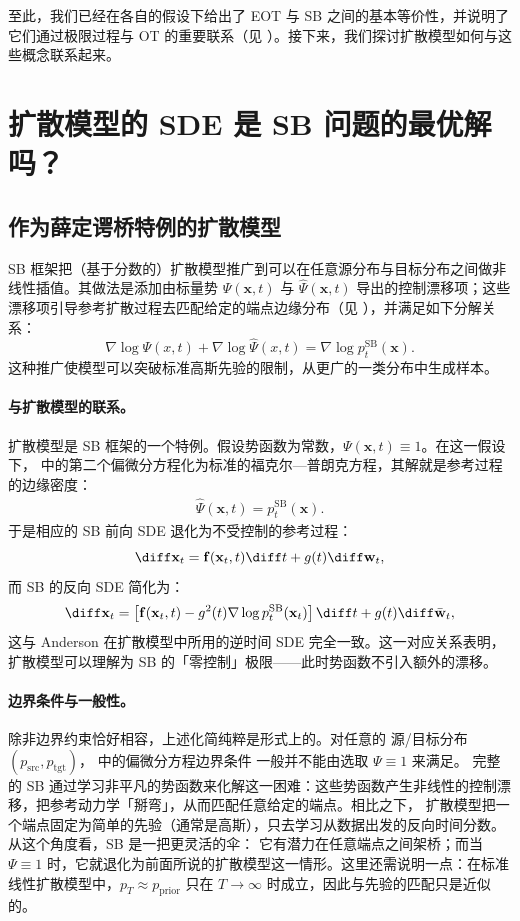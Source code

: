 至此，我们已经在各自的假设下给出了 EOT 与 SB 之间的基本等价性，并说明了它们通过极限过程与 OT 的重要联系（见 ）。接下来，我们探讨扩散模型如何与这些概念联系起来。


\section{扩散模型的 SDE 是 SB 问题的最优解吗？}\label{sec:dm-and-sb}


\subsection{作为薛定谔桥特例的扩散模型}

SB 框架把（基于分数的）扩散模型推广到可以在任意源分布与目标分布之间做非线性插值。其做法是添加由标量势 $\Psi(\mathbf{x}, t)$ 与 $\widehat{\Psi}(\mathbf{x}, t)$ 导出的控制漂移项；这些漂移项引导参考扩散过程去匹配给定的端点边缘分布（见 ），并满足如下分解关系：
\[
\nabla\log{\Psi(x,t)}+\nabla\log{\hat{\Psi}(x,t)}=\nabla \log p_t^{\mathrm{SB}}(\mathbf{x}).
\]
这种推广使模型可以突破标准高斯先验的限制，从更广的一类分布中生成样本。

\paragraph{与扩散模型的联系。}扩散模型是 SB 框架的一个特例。假设势函数为常数，$\Psi(\mathbf{x}, t) \equiv 1$。在这一假设下， 中的第二个偏微分方程化为标准的福克尔—普朗克方程，其解就是参考过程的边缘密度：
\begin{align}\label{eq:sb-backward-potential}
    \widehat{\Psi}(\mathbf{x}, t) = p_t^{\mathrm{SB}}(\mathbf{x}).
\end{align}
于是相应的 SB 前向 SDE 退化为不受控制的参考过程：
\[
    \diff\mathbf{x}_t = \mathbf{f}(\mathbf{x}_t, t)\diff t + g(t)\diff\mathbf{w}_t,
\]
而 SB 的反向 SDE 简化为：
\[
    \diff\mathbf{x}_t = \left[\mathbf{f}(\mathbf{x}_t, t) - g^2(t) \nabla \log p_t^{\mathrm{SB}}(\mathbf{x}_t) \right]\diff t + g(t)\diff\bar{\mathbf{w}}_t,
\]
这与 Anderson 在扩散模型中所用的逆时间 SDE 完全一致。这一对应关系表明，扩散模型可以理解为 SB 的「零控制」极限——此时势函数不引入额外的漂移。

\paragraph{边界条件与一般性。}
除非边界约束恰好相容，上述化简纯粹是形式上的。对任意的
源/目标分布 $(p_{\mathrm{src}},p_{\mathrm{tgt}})$， 中的偏微分方程边界条件
一般并不能由选取 $\Psi\equiv 1$ 来满足。
完整的 SB 通过学习非平凡的势函数来化解这一困难：这些势函数产生非线性的控制漂移，把参考动力学「掰弯」，从而匹配任意给定的端点。相比之下，
扩散模型把一个端点固定为简单的先验（通常是高斯），只去学习从数据出发的反向时间分数。从这个角度看，SB 是一把更灵活的伞：
它有潜力在任意端点之间架桥；而当 $\Psi\equiv 1$ 时，它就退化为前面所说的扩散模型这一情形。这里还需说明一点：在标准线性扩散模型中，$p_T \approx p_{\mathrm{prior}}$ 只在 $T \to \infty$ 时成立，因此与先验的匹配只是近似的。


